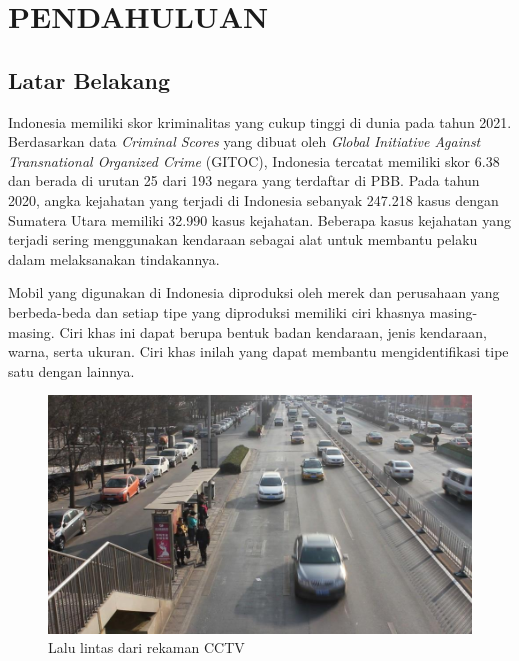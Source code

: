 \chapter{PENDAHULUAN}
\label{chap:pendahuluan}

\section{Latar Belakang}
\label{sec:latarbelakang}

Indonesia memiliki skor kriminalitas yang cukup tinggi di dunia pada tahun 2021. \linebreak
Berdasarkan data \emph{Criminal Scores} yang dibuat oleh \emph{Global Initiative Against Transnational Organized Crime} 
(GITOC), Indonesia tercatat memiliki skor 6.38 dan berada di urutan 25 dari 193 negara yang 
terdaftar di PBB\parencite{Gitoc2021}. Pada tahun 2020, angka kejahatan yang terjadi di Indonesia 
sebanyak 247.218 kasus dengan Sumatera Utara memiliki 32.990 kasus kejahatan\parencite{Bpskriminal2021}.
Beberapa kasus kejahatan yang terjadi sering menggunakan kendaraan sebagai alat untuk membantu pelaku 
dalam melaksanakan tindakannya.

Mobil yang digunakan di Indonesia diproduksi oleh merek dan perusahaan yang berbeda-beda 
dan setiap tipe yang diproduksi memiliki ciri khasnya masing-masing. Ciri khas ini dapat 
berupa bentuk badan kendaraan, jenis kendaraan, warna, serta ukuran. Ciri khas inilah 
yang dapat membantu mengidentifikasi tipe satu dengan lainnya.

\begin{figure}[ht]
      \centering
      \includegraphics[scale=0.3]{gambar/Mobil.jpg}
      \caption{Lalu lintas dari rekaman CCTV}
      \label{fig:RekamanCCTV}
\end{figure}


